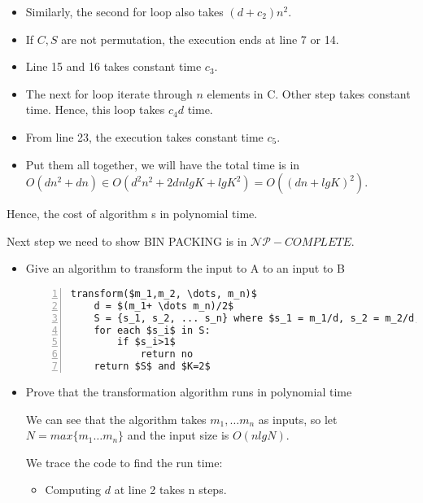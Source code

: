 \documentclass{cpsc413Solutions}
\begin{document}
\begin{problemlist}
\begin{problem}
\begin{answer}
\begin{itemize}
\begin{itemize}
        \item Similarly, the second for loop also takes $(d+c_2)n^2$.
        
        \item If $C,S$ are not permutation, the execution ends at line 7 or 14.
        
        \item Line 15 and 16 takes constant time $c_3$.
        
        \item The next for loop iterate through $n$ elements in C. Other step takes constant time. Hence, this loop takes $c_4d$ time.
        
        \item From line 23, the execution takes constant time $c_5$.
        
        \item Put them all together, we will have the total time is in $O(dn^2+dn) \in O(d^2n^2+2dnlgK + lgK^2) = O((dn+lgK)^2)$.
    \end{itemize}
    
    Hence, the cost of algorithm s in polynomial time.
\end{itemize}


Next step we need to show BIN PACKING is in $\mathcal{NP}-COMPLETE$.

\begin{itemize}
    \item Give an algorithm to transform the input to A to an input to B
    
     \begin{lstlisting}[numbers=left, mathescape=true]
transform($m_1,m_2, \dots, m_n)$
    d = $(m_1+ \dots m_n)/2$
    S = {s_1, s_2, ... s_n} where $s_1 = m_1/d, s_2 = m_2/d, \dots s_n = m_n/d$
    for each $s_i$ in S:
        if $s_i>1$
            return no
    return $S$ and $K=2$ 
     \end{lstlisting}
    
    \item Prove that the transformation algorithm runs in polynomial time
    
    We can see that the algorithm takes $m_1, \dots m_n$ as inputs, so let $N = max \{m_1 \dots m_n \}$ and the input size is $O(nlgN)$.
    
    We trace the code to find the run time:
    \begin{itemize}
        \item Computing $d$ at line 2 takes n steps.
        

\end{itemize}
\end{itemize}
\end{answer}
\end{problem}
\end{problemlist}
\end{document}
